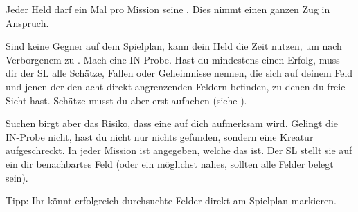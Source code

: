 {		
			Jeder Held darf ein Mal pro Mission seine . Dies nimmt einen ganzen Zug in Anspruch.

			Sind keine Gegner auf dem Spielplan, kann dein Held die Zeit nutzen, um nach Verborgenem zu . Mach eine IN-Probe. Hast du mindestens einen Erfolg, muss dir der SL alle Schätze, Fallen oder Geheimnisse nennen, die sich auf deinem Feld und jenen der den acht direkt angrenzenden Feldern befinden, zu denen du freie Sicht hast. Schätze musst du aber erst aufheben (siehe ).

			Suchen birgt aber das Risiko, dass eine  auf dich aufmerksam wird. Gelingt die IN-Probe nicht, hast du nicht nur nichts gefunden, sondern eine Kreatur aufgeschreckt. In jeder Mission ist angegeben, welche das ist. Der SL stellt sie auf ein dir benachbartes Feld (oder ein möglichst nahes, sollten alle Felder belegt sein).

			Tipp: Ihr könnt erfolgreich durchsuchte Felder direkt am Spielplan markieren.
}

